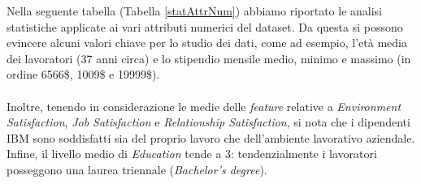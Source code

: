 \noindent Nella seguente tabella (Tabella \ref{statAttrNum}) abbiamo riportato le analisi statistiche applicate ai vari attributi numerici del dataset. Da questa si possono evincere alcuni valori chiave per lo studio dei dati, come ad esempio, l'età media dei lavoratori (37 anni circa) e lo stipendio mensile medio, minimo e massimo (in ordine 6566\$, 1009\$ e 19999\$). \\\\Inoltre, tenendo in considerazione le medie delle \textit{\textit{feature}} relative a \textit{Environment Satisfaction}, \textit{Job Satisfaction} e \textit{Relationship Satisfaction}, si nota che i dipendenti IBM sono  soddisfatti sia del proprio lavoro che dell'ambiente lavorativo aziendale. Infine, il livello medio di \textit{Education} tende a 3: tendenzialmente i lavoratori posseggono una laurea triennale (\textit{Bachelor's degree}).
